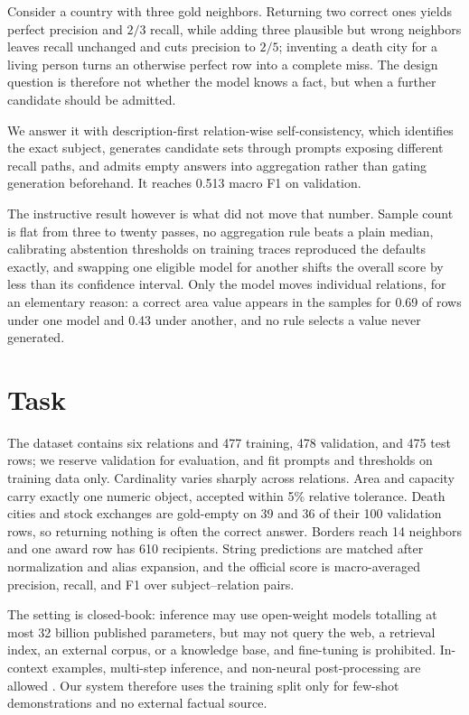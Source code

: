 \documentclass[11pt]{article}
\begin{document}
Consider a country with three gold neighbors. Returning two correct ones yields
perfect precision and \(2/3\) recall, while adding three plausible but wrong
neighbors leaves recall unchanged and cuts precision to \(2/5\); inventing a
death city for a living person turns an otherwise perfect row into a complete
miss. The design question is therefore not whether the model knows a fact, but
when a further candidate should be admitted.

We answer it with description-first relation-wise self-consistency, which
identifies the exact subject, generates candidate sets through prompts exposing
different recall paths, and admits empty answers into aggregation rather than
gating generation beforehand. It reaches 0.513 macro F1 on validation.

The instructive result however is what did not move that number. Sample count is
flat from three to twenty passes, no aggregation rule beats a plain median,
calibrating abstention thresholds on training traces reproduced the defaults
exactly, and swapping one eligible model for another shifts the overall score
by less than its confidence interval. Only the model moves individual relations,
for an elementary reason: a correct area value appears in the samples for 0.69
of rows under one model and 0.43 under another, and no rule selects a value
never generated.

\section{Task}
\label{sec:task}

The dataset contains six relations and 477 training, 478 validation, and 475
test rows; we reserve validation for evaluation, and fit prompts and thresholds
on training data only. Cardinality varies sharply across relations. Area and
capacity carry exactly one numeric object, accepted within 5\% relative
tolerance. Death cities and stock exchanges are gold-empty on 39 and 36 of
their 100 validation rows, so returning nothing is often the correct answer.
Borders reach 14 neighbors and one award row has 610 recipients. String
predictions are matched after normalization and alias expansion, and the
official score is macro-averaged precision, recall, and F1 over
subject--relation pairs.

The setting is closed-book: inference may use open-weight models totalling at
most 32 billion published parameters, but may not query the web, a retrieval
index, an external corpus, or a knowledge base, and fine-tuning is prohibited.
In-context examples, multi-step inference, and non-neural post-processing are
allowed \citep{kalo-etal-2026-akbc-shared-task}. Our system therefore uses
the training split only for few-shot demonstrations and no external factual
source.
\end{document}
